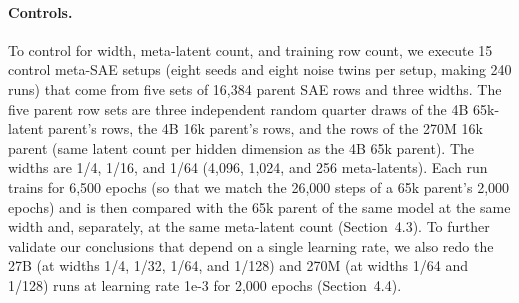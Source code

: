 \paragraph{Controls.}
To control for width, meta-latent count, and training row count, we execute 15 control meta-SAE setups (eight seeds and eight noise twins per setup, making 240 runs) that come from five sets of 16,384 parent SAE rows and three widths.
The five parent row sets are three independent random quarter draws of the 4B 65k-latent parent's rows, the 4B 16k parent's rows, and the rows of the 270M 16k parent (same latent count per hidden dimension as the 4B 65k parent).
The widths are 1/4, 1/16, and 1/64 (4,096, 1,024, and 256 meta-latents).
Each run trains for 6,500 epochs (so that we match the 26,000 steps of a 65k parent's 2,000 epochs) and is then compared with the 65k parent of the same model at the same width and, separately, at the same meta-latent count (Section~4.3).
To further validate our conclusions that depend on a single learning rate, we also redo the 27B (at widths 1/4, 1/32, 1/64, and 1/128) and 270M (at widths 1/64 and 1/128) runs at learning rate 1e-3 for 2,000 epochs (Section~4.4).
